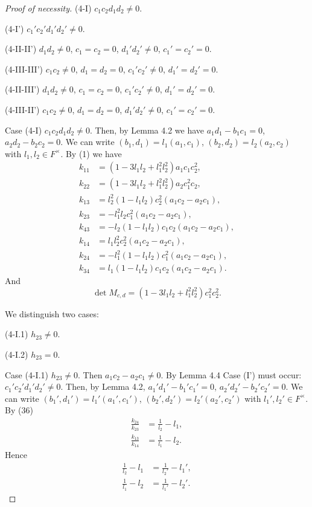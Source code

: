 \documentclass{article}
\begin{document}
\begin{proof}[Proof of necessity]
(4-I) $c_1c_2d_1d_2\ne 0$.

(4-I') $c_1'c_2'd_1'd_2'\ne 0$.

(4-II-II') $d_1d_2\ne 0$, $c_1=c_2=0$,  $d_1'd_2'\ne 0$, $c_1'=c_2'=0$.

(4-III-III') $c_1c_2\ne 0$, $d_1=d_2=0$, $c_1'c_2'\ne 0$, $d_1'=d_2'=0$.

(4-II-III') $d_1d_2\ne 0$, $c_1=c_2=0$, $c_1'c_2'\ne 0$, $d_1'=d_2'=0$.

(4-III-II') $c_1c_2\ne 0$, $d_1=d_2=0$, $d_1'd_2'\ne 0$, $c_1'=c_2'=0$.

Case (4-I) $c_1c_2d_1d_2\ne 0$.
Then, by Lemma 4.2 we have
$a_1d_1-b_1c_1=0$, $a_2d_2-b_2c_2=0$.
We can write
$(b_1,d_1)=l_1(a_1,c_1)$, $(b_2,d_2)=l_2(a_2,c_2)$
with $l_1,l_2\in F^{\times}$.
By (1) we have 
\begin{align*}
k_{11}&=(1-3l_1l_2+l_1^2l_2^2)a_1c_1c_2^2,\\
k_{22}&=(1-3l_1l_2+l_1^2l_2^2)a_2c_1^2c_2,\\
k_{13}&=l_2^2(1-l_1l_2)c_2^2(a_1c_2-a_2c_1),\\
k_{23}&=-l_1^2l_2c_1^2(a_1c_2-a_2c_1),\\
k_{43}&=-l_2(1-l_1l_2)c_1c_2(a_1c_2-a_2c_1),\\
k_{14}&=l_1l_2^2c_2^2(a_1c_2-a_2c_1),\\
k_{24}&=-l_1^2(1-l_1l_2)c_1^2(a_1c_2-a_2c_1),\\
k_{34}&=l_1(1-l_1l_2)c_1c_2(a_1c_2-a_2c_1).
\tag{36}
\end{align*}
And
$$
\det M_{c,d}=(1-3l_1l_2+l_1^2l_2^2)c_1^2c_2^2.
$$

We distinguish two cases:


(4-I.1) $h_{23}\ne 0$.

(4-I.2) $h_{23}=0$.


Case (4-I.1) $h_{23}\ne 0$. Then
$a_1c_2-a_2 c_1\ne 0$.
By Lemma 4.4  Case (I') must occur:
$c_1'c_2'd_1'd_2'\ne 0$.
Then, by Lemma 4.2,
$a_1'd_1'-b_1'c_1'=0$, $a_2'd_2'-b_2'c_2'=0$.
We can write
$(b_1',d_1')=l_1'(a_1',c_1')$, 
$(b_2',d_2')=l_2'(a_2',c_2')$
with $l_1',l_2'\in F^{\times}$.
By (36)
\begin{align*}
\frac{k_{24}}{k_{23}}&=\frac{1}{l_2}-l_1,\\
\frac{k_{13}}{k_{14}}&=\frac{1}{l_1}-l_2.
\end{align*}
Hence
\begin{align*}
\frac{1}{l_2}-l_1&=\frac{1}{l_2'}-l_1', \tag{37}\\
\frac{1}{l_1}-l_2&=\frac{1}{l_1'}-l_2'. \tag{38}
\end{align*}


\end{proof}
\end{document}
